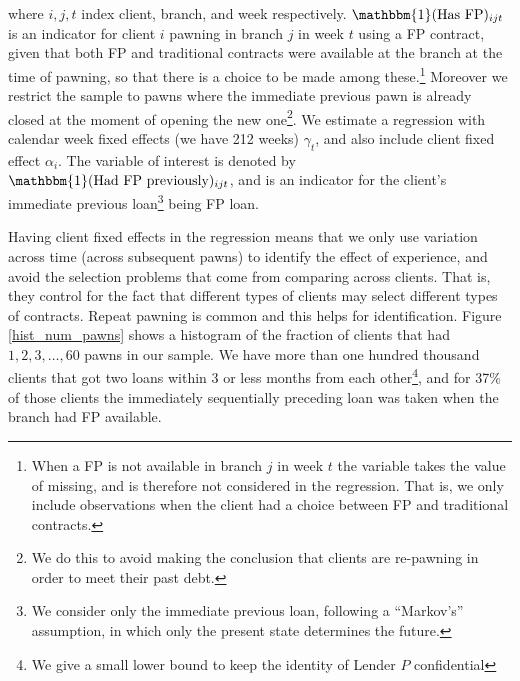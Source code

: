 \noindent where $i,j,t$ index client, branch, and week respectively. $\mathbbm{1}(\text{Has FP})_{ijt}$ is an indicator for client $i$ pawning in branch $j$ in week $t$ using a FP contract, given that both FP and traditional contracts were available at the branch at the time of pawning, so that there is a choice to be made among these.\footnote{When a FP is not available in branch $j$ in week $t$ the variable takes the value of missing, and is therefore not considered in the regression. That is, we only include observations when the client had a choice between FP and traditional contracts.} Moreover we restrict the sample to pawns where the immediate previous pawn is already closed at the moment of opening the new one\footnote{We do this to avoid making the conclusion that clients are re-pawning in order to meet their past debt.}. We estimate a regression with calendar week fixed effects (we have 212 weeks) $\gamma_t$, and also include client fixed effect $\alpha_i$.  The variable of interest is denoted by $\mathbbm{1}(\text{Had FP previously})_{ijt}$, and is an indicator for the client's immediate previous loan\footnote{We consider only the immediate previous loan, following a ``Markov's'' assumption, in which only the present state determines the future.} being FP loan. 

Having client fixed effects in the regression means that we only use variation across time (across subsequent pawns) to identify the effect of experience, and avoid the selection problems that come from comparing across clients. That is, they control for the fact that different types of clients may select different types of contracts. Repeat pawning is common and this helps for identification. Figure \ref{hist_num_pawns} shows a histogram of the fraction of clients that had $1, 2, 3,\ldots, 60$ pawns in our sample. We have more than one hundred thousand clients that got two loans within 3 or less months from each other\footnote{We give a small lower bound to keep the identity of Lender $P$ confidential}, and for 37\% of those clients the immediately sequentially preceding loan was taken when the branch had FP available.\\

